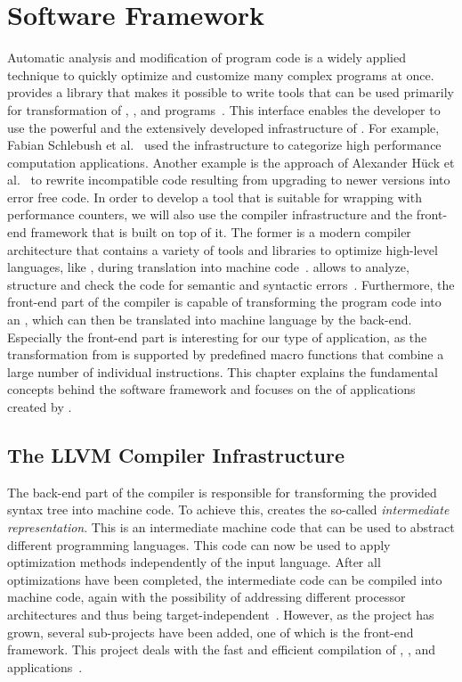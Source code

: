 \chapter{Software Framework}
\label{chapter2}
Automatic analysis and modification of program code is a widely applied technique to quickly optimize and customize many complex programs at once. \CLANG provides a library that makes it possible to write tools that can be used primarily for \SOUTOSOU transformation of \C, \CPP, and \OC programs~\cite{ClangLibTooling}. This interface enables the developer to use the powerful \astsmall and the extensively developed infrastructure of \CLANG. For example, Fabian Schlebush et al.~\cite{schlebushrelwork} used the infrastructure to categorize high performance computation applications. Another example is the approach of Alexander Hück et al.~\cite{hueckrelwork} to rewrite incompatible code resulting from upgrading to newer versions into error free code. In order to develop a tool that is suitable for wrapping \roismall with performance counters, we will also use the \LLVM compiler infrastructure and the front-end framework \CLANG that is built on top of it. The former is a modern compiler architecture that contains a variety of tools and libraries to optimize high-level languages, like \CPP, during translation into machine code~\cite{LLVMPaper}. \CLANG allows to analyze, structure and check the code for semantic and syntactic errors~\cite{ClangLanding}. Furthermore, the front-end part of the compiler is capable of transforming the program code into an \astsmall, which can then be translated into machine language by the back-end. Especially the front-end part is interesting for our type of application, as the transformation from \SOUTOSOU is supported by predefined macro functions that combine a large number of individual instructions. This chapter explains the fundamental concepts behind the software framework and focuses on the \astsmall of \CPP applications created by \CLANG.

\section{The LLVM Compiler Infrastructure}
The back-end part of the compiler is responsible for transforming the provided syntax tree into machine code. To achieve this, \LLVM creates the so-called \LLVM \emph{intermediate representation}. This is an intermediate machine code that can be used to abstract different programming languages. This code can now be used to apply optimization methods independently of the input language. After all optimizations have been completed, the intermediate code can be compiled into machine code, again with the possibility of addressing different processor architectures and thus being target-independent~\cite{LLVMInformation}. However, as the \LLVM project has grown, several sub-projects have been added, one of which is the \CLANG front-end framework. This project deals with the fast and efficient compilation of \C, \CPP, and \OC applications~\cite{LLVMLanding}. 

